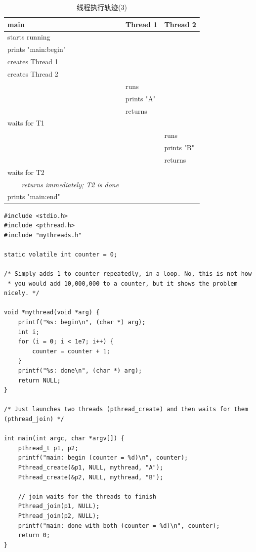 \begin{table}[p]
\vspace{0.5cm}
{\scriptsize
\begin{tabular}{p{5cm} l l}
\textbf{main}&\textbf{Thread 1}&\textbf{Thread 2}\\ \midrule[1.1pt]
starts running &  & \\
prints "main:begin" &  & \\
creates Thread 1&  &  \\
creates Thread 2&  &  \\
  & runs &  \\
  & prints "A" &  \\
  & returns &  \\
waits for T1 &  &  \\
  &  & runs \\
  &  & prints "B" \\
  &  & returns \\
waits for T2 &  &  \\
\textsl{~~~~returns immediately; T2 is done} &  & \\
prints "main:end" &  &  \\
\end{tabular}}
\caption{\footnotesize 线程执行轨迹(3)}\color{black}\label{tab26-1}
\end{table}
\clearpage


\begin{lstlisting}
#include <stdio.h>
#include <pthread.h>
#include "mythreads.h"

static volatile int counter = 0;

/* Simply adds 1 to counter repeatedly, in a loop. No, this is not how 
 * you would add 10,000,000 to a counter, but it shows the problem nicely. */

void *mythread(void *arg) {
    printf("%s: begin\n", (char *) arg);
    int i;
    for (i = 0; i < 1e7; i++) {
        counter = counter + 1;
    }
    printf("%s: done\n", (char *) arg);
    return NULL;
}

/* Just launches two threads (pthread_create) and then waits for them (pthread_join) */

int main(int argc, char *argv[]) {
    pthread_t p1, p2;
    printf("main: begin (counter = %d)\n", counter);
    Pthread_create(&p1, NULL, mythread, "A");
    Pthread_create(&p2, NULL, mythread, "B");

    // join waits for the threads to finish
    Pthread_join(p1, NULL);
    Pthread_join(p2, NULL);
    printf("main: done with both (counter = %d)\n", counter);
    return 0;
}
\end{lstlisting}

